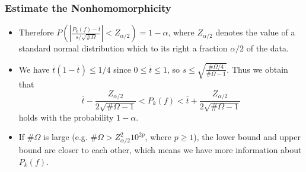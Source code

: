 \documentclass[
    aspectratio=169,                   %
]{beamer}
\begin{document}
    \begin{frame}
        \frametitle{Estimate the Nonhomomorphicity}
    
        \begin{itemize}
            \item Therefore $P\left( \left| \frac{P_k(f)-\overline{t}}{s/\sqrt{\#\Omega}}\right|<Z_{\alpha/2} \right)=1-\alpha$, where $Z_{\alpha/2}$ denotes the value of a standard normal distribution which to
            its right a fraction $\alpha/2$ of the data.
            \item We have $\overline{t}(1-\overline{t})\le 1/4$ since $0\le\overline{t}\le 1$, so $s\le\sqrt{\frac{\#\Omega/4}{\#\Omega-1}} $. Thus we obtain that 
            \[\overline{t}-\frac{Z_{\alpha/2}}{2\sqrt{\#\Omega-1}}< P_k(f) <\overline{t}+\frac{Z_{\alpha/2}}{2\sqrt{\#\Omega-1}} \]
            holds with the probability $1-\alpha$.
            \item If $\#\Omega$ is large (e.g. $\#\Omega>Z_{\alpha/2}^2 10^{2p}$, where $p\ge 1$), the lower bound and upper bound are closer to each other, which means we have more information about $P_k(f)$.
        \end{itemize}
    
    \end{frame}
\end{document}

